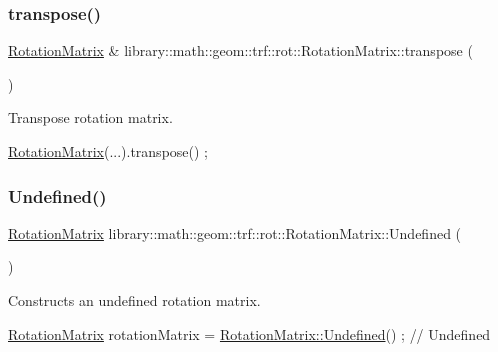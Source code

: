\subsubsection{\texorpdfstring{transpose()}{transpose()}}
{\footnotesize\ttfamily \hyperlink{classlibrary_1_1math_1_1geom_1_1trf_1_1rot_1_1_rotation_matrix}{Rotation\+Matrix} \& library\+::math\+::geom\+::trf\+::rot\+::\+Rotation\+Matrix\+::transpose (\begin{DoxyParamCaption}{ }\end{DoxyParamCaption})}



Transpose rotation matrix. 


\begin{DoxyCode}
\hyperlink{classlibrary_1_1math_1_1geom_1_1trf_1_1rot_1_1_rotation_matrix_a667d2c05aa5b0cc88775938d11164cdc}{RotationMatrix}(...).transpose() ;
\end{DoxyCode}
 \mbox{\label{classlibrary_1_1math_1_1geom_1_1trf_1_1rot_1_1_rotation_matrix_a0d1a95670bf9a5ae6bb2ac1bdee0294f}} 
\subsubsection{\texorpdfstring{Undefined()}{Undefined()}}
{\footnotesize\ttfamily \hyperlink{classlibrary_1_1math_1_1geom_1_1trf_1_1rot_1_1_rotation_matrix}{Rotation\+Matrix} library\+::math\+::geom\+::trf\+::rot\+::\+Rotation\+Matrix\+::\+Undefined (\begin{DoxyParamCaption}{ }\end{DoxyParamCaption})\hspace{0.3cm}{\ttfamily [static]}}



Constructs an undefined rotation matrix. 


\begin{DoxyCode}
\hyperlink{classlibrary_1_1math_1_1geom_1_1trf_1_1rot_1_1_rotation_matrix_a667d2c05aa5b0cc88775938d11164cdc}{RotationMatrix} rotationMatrix = \hyperlink{classlibrary_1_1math_1_1geom_1_1trf_1_1rot_1_1_rotation_matrix_a0d1a95670bf9a5ae6bb2ac1bdee0294f}{RotationMatrix::Undefined}() ; \textcolor{comment}{//
       Undefined}
\end{DoxyCode}


